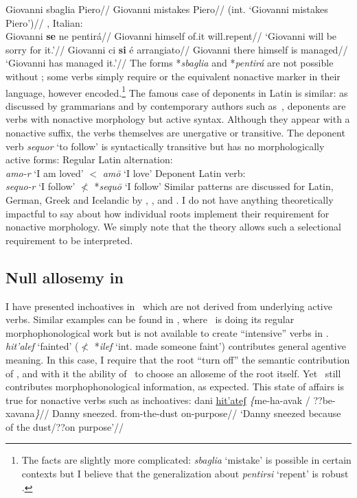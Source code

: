 	\a \ljudge{*} \begingl
		\gla Giovanni sbaglia Piero//
		\glb Giovanni mistakes Piero//
		\glft (int. `Giovanni mistakes Piero')//
	\endgl
\xe
\ex \citet[70]{burzio86}, Italian:\\
	\begingl
		\gla Giovanni \textbf{se} ne pentir\'a//
		\glb Giovanni himself of.it will.repent//
		\glft `Giovanni will be sorry for it.'//
	\endgl
\xe
\ex
	\begingl
		\gla Giovanni ci \textbf{si} \'e arrangiato//
		\glb Giovanni there himself is managed//
		\glft `Giovanni has managed it.'//
	\endgl
\xe
The forms *\emph{sbaglia} and *\emph{pentir\'a} are not possible without ; some verbs simply require  or the equivalent nonactive marker in their language, however encoded.\footnote{The facts are slightly more complicated: \emph{sbaglia} `mistake' is possible in certain contexts but I believe that the generalization about \emph{pentirsi} `repent' is robust \citep[40]{burzio86}.} The famous case of deponents in Latin is similar: as discussed by grammarians and by contemporary authors such as~\cite{aronoff94}, deponents are verbs with nonactive morphology but active syntax. Although they appear with a nonactive suffix, the verbs themselves are unergative or transitive. The deponent verb \emph{sequor} `to follow' is syntactically transitive but has no morphologically active forms:
\pex
    \a Regular Latin alternation:\\
        \emph{amo-r} `I am loved' $<$ \emph{am\=o} `I love'
    \a Deponent Latin verb:\\
        \emph{sequo-r} `I follow' $\nless$ *\emph{sequ\=o} `I follow'
\xe
Similar patterns are discussed for Latin, German, Greek and Icelandic by \cite{embick04}, \cite{kallulli13}, \cite{kastnerzu15li} and \cite{wood15springer}. I do not have anything theoretically impactful to say about how individual roots implement their requirement for nonactive morphology. We simply note that the theory allows such a {selectional requirement} to be interpreted.

	\subsection{Null allosemy in \thit} \label{syn:middle:nonactive:elena}
I have presented inchoatives in \tnif~which are not derived from underlying active verbs. Similar examples can be found in \thit, where \va~is doing its regular morphophonological work but is not available to create ``intensive'' verbs in \tpie.
\ex \emph{hit'alef} `fainted' ($\nless$ *\emph{ilef} `int. made someone faint')
\xe
{\va} contributes general agentive meaning. In this case, I require that the root ``turn off'' the semantic contribution of \va, and with it the ability of \va~to choose an alloseme of the root itself. Yet \va~still contributes morphophonological information, as expected. This state of affairs is true for nonactive verbs such as inchoatives:
\pex 
	\a \label{ex:incho1} \begingl
	\gla dani \underline{hit'ateʃ} \emph{\{}me-ha-avak / ??be-xavana\emph{\}}//
	\glb Danny sneezed. \phantom{\{}from-the-dust {} \phantom{??}on-purpose//
	\glft `Danny sneezed because of the dust/??on purpose'//
	\endgl
	
